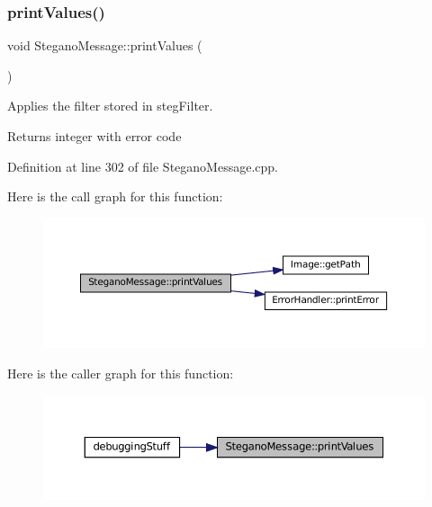 \subsubsection{\texorpdfstring{printValues()}{printValues()}}
{\footnotesize\ttfamily void Stegano\+Message\+::print\+Values (\begin{DoxyParamCaption}{ }\end{DoxyParamCaption})}



Applies the filter stored in steg\+Filter. 

\begin{DoxyReturn}{Returns}
integer with error code 
\end{DoxyReturn}


Definition at line 302 of file Stegano\+Message.\+cpp.

Here is the call graph for this function\+:\nopagebreak
\begin{figure}[H]
\begin{center}
\leavevmode
\includegraphics[width=350pt]{classSteganoMessage_a3ea3f5ff720bf56d33f168d47e2897b0_cgraph}
\end{center}
\end{figure}
Here is the caller graph for this function\+:\nopagebreak
\begin{figure}[H]
\begin{center}
\leavevmode
\includegraphics[width=350pt]{classSteganoMessage_a3ea3f5ff720bf56d33f168d47e2897b0_icgraph}
\end{center}
\end{figure}
\mbox{\label{classSteganoMessage_a5c3ef910b17f4bbe32a73a33be9d7586}} 
